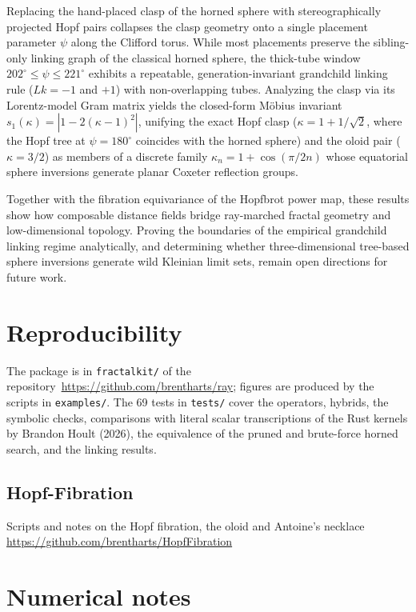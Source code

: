 \documentclass[11pt,a4paper]{article}
\theoremstyle{remark}
\newcommand{\code}[1]{\texttt{#1}}
\begin{document}
Replacing the hand-placed clasp of the horned sphere with stereographically projected Hopf pairs collapses the clasp geometry onto a single placement parameter $\psi$ along the Clifford torus. While most placements preserve the sibling-only linking graph of the classical horned sphere, the thick-tube window $202^\circ \le \psi \le 221^\circ$ exhibits a repeatable, generation-invariant grandchild linking rule ($Lk = -1$ and $+1$) with non-overlapping tubes. Analyzing the clasp via its Lorentz-model Gram matrix yields the closed-form M\"obius invariant $s_1(\kappa) = |1 - 2(\kappa - 1)^2|$, unifying the exact Hopf clasp ($\kappa = 1 + 1/\sqrt{2}$, where the Hopf tree at $\psi = 180^\circ$ coincides with the horned sphere) and the oloid pair ($\kappa = 3/2$) as members of a discrete family $\kappa_n = 1 + \cos(\pi/2n)$ whose equatorial sphere inversions generate planar Coxeter reflection groups.

Together with the fibration equivariance of the Hopfbrot power map, these results show how composable distance fields bridge ray-marched fractal geometry and low-dimensional topology. Proving the boundaries of the empirical grandchild linking regime analytically, and determining whether three-dimensional tree-based sphere inversions generate wild Kleinian limit sets, remain open directions for future work.

\appendix
\footnotesize

\section{Reproducibility}
\label{sec:repro}

The package is in \code{fractalkit/} of the repository~\url{https://github.com/brentharts/ray}; figures are produced by the scripts in \code{examples/}.  The 69 tests in \code{tests/} cover the operators, hybrids, the symbolic checks, comparisons with literal scalar transcriptions of the Rust kernels by Brandon Hoult (2026), the equivalence of the pruned and brute-force horned search, and the linking results.

\subsection{Hopf-Fibration}
\label{hopffibration}
Scripts and notes on the Hopf fibration, the oloid and Antoine's necklace
\newline
\url{https://github.com/brentharts/HopfFibration}

\section{Numerical notes}
\label{sec:numerics}
\end{document}
